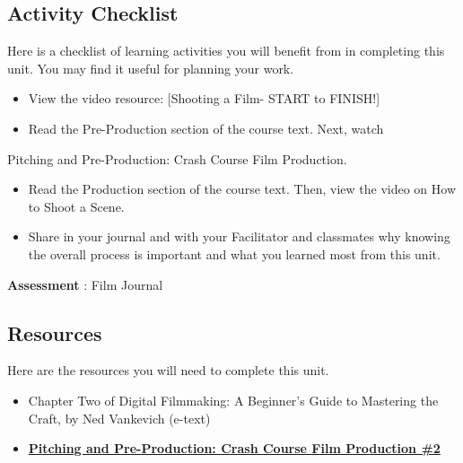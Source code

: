 \documentclass[
]{book}
\providecommand{\tightlist}{%
  \setlength{\itemsep}{0pt}\setlength{\parskip}{0pt}}
\begin{document}
\hypertarget{activity-checklist-1}{%
\subsection*{Activity Checklist}\label{activity-checklist-1}}

\begin{reflect}
Here is a checklist of learning activities you will benefit from in completing this unit. You may find it useful for planning your work.

\begin{itemize}
\tightlist
\item
  View the video resource: {[}Shooting a Film- START to FINISH!{]}
\end{itemize}

\begin{itemize}
\tightlist
\item
  Read the Pre-Production section of the course text.
  Next, watch
\end{itemize}

Pitching and Pre-Production: Crash Course Film Production.

\begin{itemize}
\item
  Read the Production section of the course text. Then, view the video on How to Shoot a Scene.
\item
  Share in your journal and with your Facilitator and classmates why knowing the overall process is important and what you learned most from this unit.
\end{itemize}

\textbf{Assessment} : Film Journal
\end{reflect}

\hypertarget{resources-1}{%
\subsection*{Resources}\label{resources-1}}

Here are the resources you will need to complete this unit.

\begin{itemize}
\item
  Chapter Two of Digital Filmmaking: A Beginner's Guide to Mastering the Craft, by Ned Vankevich (e-text)
\item
  \href{https://www.youtube.com/watch?v=JE53JL60ihc}{\textbf{Pitching and Pre-Production: Crash Course Film Production \#2}}
\end{itemize}
\end{document}
